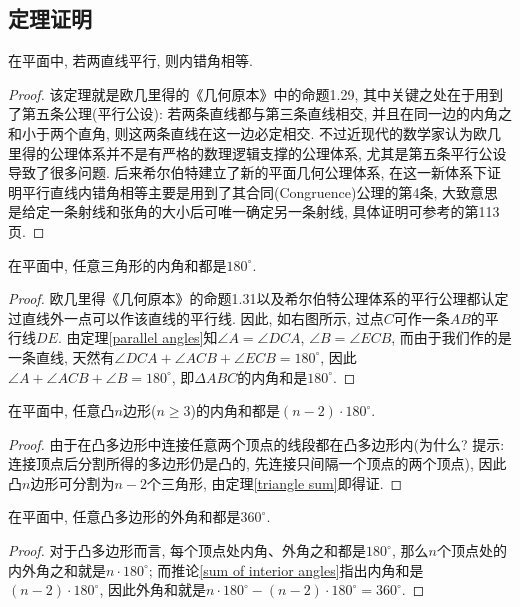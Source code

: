 \documentclass[main]{subfiles}
\begin{document}
{\subsection{定理证明}
	\begin{theorem}\label{parallel angles}
		在平面中, 若两直线平行, 则内错角相等.
	\end{theorem}
	\begin{proof}
		该定理就是欧几里得的《几何原本》\cite{Euclid}中的命题1.29, 其中关键之处在于用到了{\kaishu 第五条公理(平行公设)}: 若两条直线都与第三条直线相交, 并且在同一边的内角之和小于两个直角, 则这两条直线在这一边必定相交. 不过近现代的数学家认为欧几里得的公理体系并不是有严格的数理逻辑支撑的公理体系, 尤其是第五条平行公设导致了很多问题. 后来希尔伯特建立了新的平面几何公理体系\cite{Hilbert}, 在这一新体系下证明平行直线内错角相等主要是用到了其{\kaishu 合同(Congruence)公理的第4条}, 大致意思是给定一条射线和张角的大小后可唯一确定另一条射线, 具体证明可参考\cite{Hartshorne}的第113页.
	\end{proof}
	
	\begin{theorem}\label{triangle sum}
		在平面中, 任意三角形的内角和都是$180^{\circ}$.
	\end{theorem}
	\begin{proof}
		欧几里得《几何原本》\cite{Euclid}的命题1.31以及希尔伯特公理体系\cite{Hilbert}的平行公理都认定过直线外一点可以作该直线的平行线. 因此, 如右图所示, 过点$C$可作一条$AB$的平行线$DE$. 由定理\ref{parallel angles}知$\angle A=\angle DCA$, $\angle B=\angle ECB$, 而由于我们作的是一条直线, 天然有$\angle DCA+\angle ACB+\angle ECB=180^{\circ}$, 因此$\angle A+\angle ACB+\angle B=180^{\circ}$, 即$\Delta ABC$的内角和是$180^{\circ}$.
	\end{proof}
	
	\begin{corollary}\label{sum of interior angles}
		在平面中, 任意凸$n$边形($n\geqslant 3$)的内角和都是$(n-2)\cdot 180^{\circ}$.
	\end{corollary}
	\begin{proof}
		由于在凸多边形中连接任意两个顶点的线段都在凸多边形内({\kaishu 为什么? 提示: 连接顶点后分割所得的多边形仍是凸的, 先连接只间隔一个顶点的两个顶点}), 因此凸$n$边形可分割为$n-2$个三角形, 由定理\ref{triangle sum}即得证.
	\end{proof}
	
	\begin{corollary}\label{sum of exterior angles}
		在平面中, 任意凸多边形的外角和都是$360^{\circ}$.
	\end{corollary}
	\begin{proof}
		对于凸多边形而言, 每个顶点处内角、外角之和都是$180^{\circ}$, 那么$n$个顶点处的内外角之和就是$n\cdot 180^{\circ}$; 而推论\ref{sum of interior angles}指出内角和是$(n-2)\cdot 180^{\circ}$, 因此外角和就是$n\cdot 180^{\circ}-(n-2)\cdot 180^{\circ}=360^{\circ}$.
	\end{proof}
	
}
\end{document}
